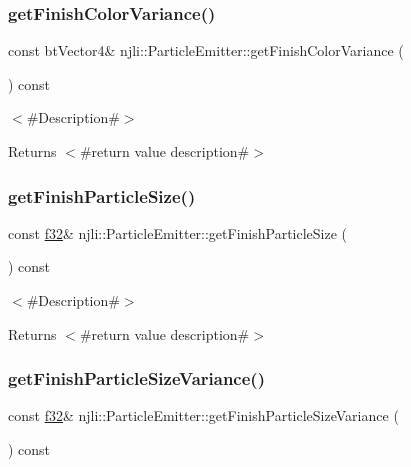 \subsubsection{\texorpdfstring{get\+Finish\+Color\+Variance()}{getFinishColorVariance()}}
{\footnotesize\ttfamily const bt\+Vector4\& njli\+::\+Particle\+Emitter\+::get\+Finish\+Color\+Variance (\begin{DoxyParamCaption}{ }\end{DoxyParamCaption}) const}

$<$\#\+Description\#$>$

\begin{DoxyReturn}{Returns}
$<$\#return value description\#$>$ 
\end{DoxyReturn}
\mbox{\label{classnjli_1_1_particle_emitter_a9b3fe805e7e88d64a61df2140e13867d}} 
\subsubsection{\texorpdfstring{get\+Finish\+Particle\+Size()}{getFinishParticleSize()}}
{\footnotesize\ttfamily const \mbox{\hyperlink{_util_8h_a5f6906312a689f27d70e9d086649d3fd}{f32}}\& njli\+::\+Particle\+Emitter\+::get\+Finish\+Particle\+Size (\begin{DoxyParamCaption}{ }\end{DoxyParamCaption}) const}

$<$\#\+Description\#$>$

\begin{DoxyReturn}{Returns}
$<$\#return value description\#$>$ 
\end{DoxyReturn}
\mbox{\label{classnjli_1_1_particle_emitter_a6e13b9c82b4ee0a9f16aee08b27d2c98}} 
\subsubsection{\texorpdfstring{get\+Finish\+Particle\+Size\+Variance()}{getFinishParticleSizeVariance()}}
{\footnotesize\ttfamily const \mbox{\hyperlink{_util_8h_a5f6906312a689f27d70e9d086649d3fd}{f32}}\& njli\+::\+Particle\+Emitter\+::get\+Finish\+Particle\+Size\+Variance (\begin{DoxyParamCaption}{ }\end{DoxyParamCaption}) const}

